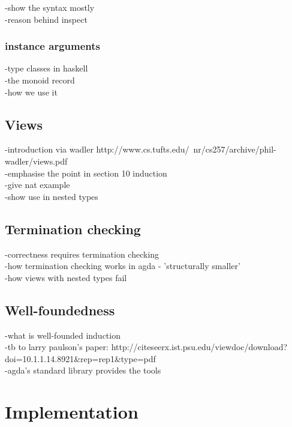 \documentclass[12pt,twoside,notitlepage]{report}
\begin{document}
-show the syntax mostly\\
-reason behind inspect\\



\subsection{instance arguments}

-type classes in haskell\\
-the monoid record\\
-how we use it\\

\section{Views}

-introduction via wadler http://www.cs.tufts.edu/~nr/cs257/archive/phil-wadler/views.pdf \\
-emphasise the point in section 10 induction \\
-give nat example \\
-show use in nested types \\

\section{Termination checking}

-correctness requires termination checking \\
-how termination checking works in agda - 'structurally smaller' \\
-how views with nested types fail \\

\section{Well-foundedness}

-what is well-founded induction \\
-tb to larry paulson's paper: http://citeseerx.ist.psu.edu/viewdoc/download?doi=10.1.1.14.8921&rep=rep1&type=pdf \\
-agda's standard library provides the tools \\

\chapter{Implementation}
\end{document}
